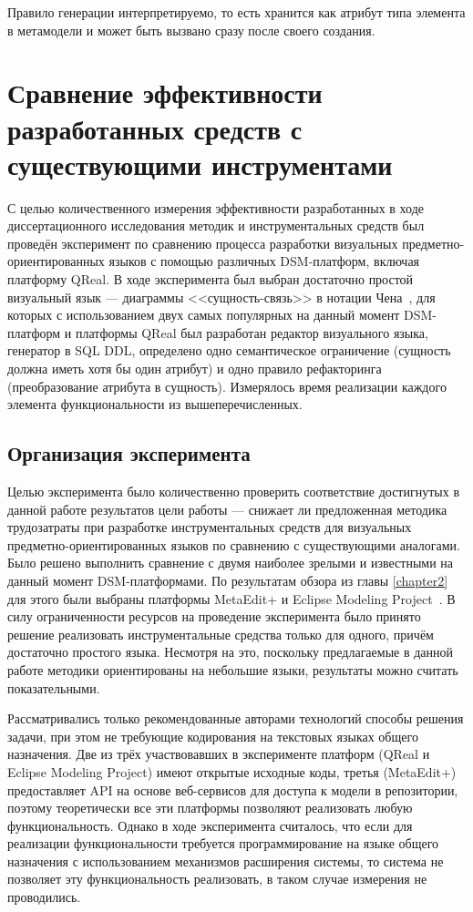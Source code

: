 Правило генерации интерпретируемо, то есть хранится как атрибут типа элемента в метамодели
и может быть вызвано сразу после своего создания. 

\section{Сравнение эффективности разработанных средств с существующими инструментами}
С целью количественного измерения эффективности разработанных в ходе диссертационного
исследования методик и инструментальных средств был проведён эксперимент по сравнению
процесса разработки визуальных предметно-ориентированных языков с помощью различных 
\ac{DSM}-платформ, включая платформу QReal. В ходе эксперимента был выбран достаточно простой визуальный
язык --- диаграммы <<сущность-связь>> в нотации Чена~\cite{chen1976er}, для которых
с использованием двух самых популярных на данный момент \ac{DSM}-платформ и платформы QReal 
был разработан редактор визуального языка, генератор в \ac{SQL} \ac{DDL}, определено 
одно семантическое ограничение (сущность должна иметь хотя бы один атрибут) и одно правило
рефакторинга (преобразование атрибута в сущность). Измерялось время реализации каждого элемента
функциональности из вышеперечисленных.

\subsection{Организация эксперимента}
Целью эксперимента было количественно проверить соответствие достигнутых в данной работе результатов
цели работы --- снижает ли предложенная методика трудозатраты при разработке инструментальных
средств для визуальных предметно-ориентированных языков по сравнению с существующими аналогами.
Было решено выполнить сравнение с двумя наиболее зрелыми и известными на данный момент 
DSM-платформами. По результатам обзора из главы \ref{chapter2} для этого были выбраны платформы
MetaEdit+\cite{kelly2008domain} и Eclipse Modeling Project~\cite{emp}. В силу ограниченности
ресурсов на проведение эксперимента было принято решение реализовать инструментальные
средства только для одного, причём достаточно простого языка. Несмотря на это, поскольку 
предлагаемые в данной работе методики ориентированы на небольшие языки, результаты можно 
считать показательными. 

Рассматривались только рекомендованные авторами технологий способы решения задачи, 
при этом не требующие кодирования на текстовых языках общего назначения. Две из трёх
участвовавших в эксперименте платформ (QReal и Eclipse Modeling Project) имеют открытые 
исходные коды, третья (MetaEdit+) предоставляет \ac{API} на основе веб-сервисов для доступа
к модели в репозитории, поэтому теоретически все эти платформы позволяют реализовать любую
функциональность. Однако в ходе эксперимента считалось, что если для реализации функциональности
требуется программирование на языке общего назначения с использованием механизмов расширения системы, 
то система не позволяет эту функциональность реализовать, в таком случае измерения не проводились.


